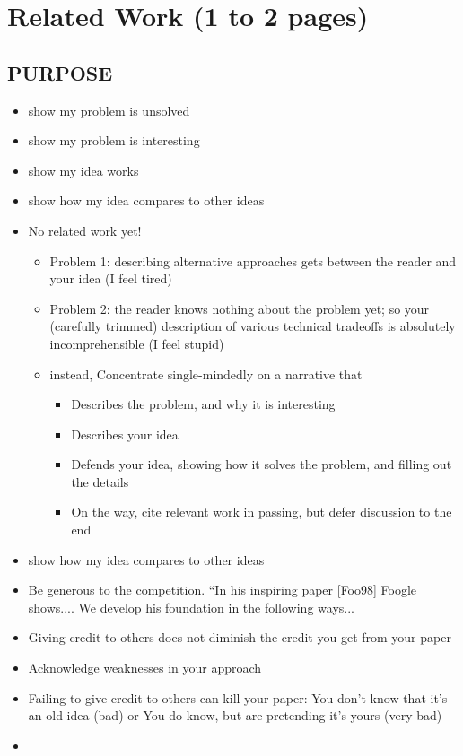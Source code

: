 \chapter{Related Work (1 to 2 pages)}

\section*{PURPOSE}
\begin{itemize}
\item show my problem is unsolved
\item show my problem is interesting
\item show my idea works
\item show how my idea compares to other ideas
\end{itemize}

\begin{itemize}
\item No related work yet!
\begin{itemize}
    \item Problem 1: describing alternative approaches gets between the reader and your idea (I feel tired)
    \item Problem 2: the reader knows nothing
    about the problem yet; so your (carefully
    trimmed) description of various technical
    tradeoffs is absolutely incomprehensible (I feel stupid)
    \item instead, Concentrate single-mindedly on a narrative that
    \begin{itemize}
        \item Describes the problem, and why it is interesting
        \item Describes your idea
        \item Defends your idea, showing how it solves the problem,
and filling out the details
        \item On the way, cite relevant work in passing, but defer
discussion to the end
    \end{itemize}
\end{itemize}

\item show how my idea compares to other ideas
\item Be generous to the competition. “In his inspiring paper
[Foo98] Foogle shows.... We develop his foundation in the
following ways...
\item Giving credit to others does not diminish
the credit you get from your paper
\item Acknowledge weaknesses in your approach
\item Failing to give credit to others can kill
your paper: You don't know that it's an old idea (bad) or You do know, but are pretending it's yours (very bad)

\item 

\end{itemize}


